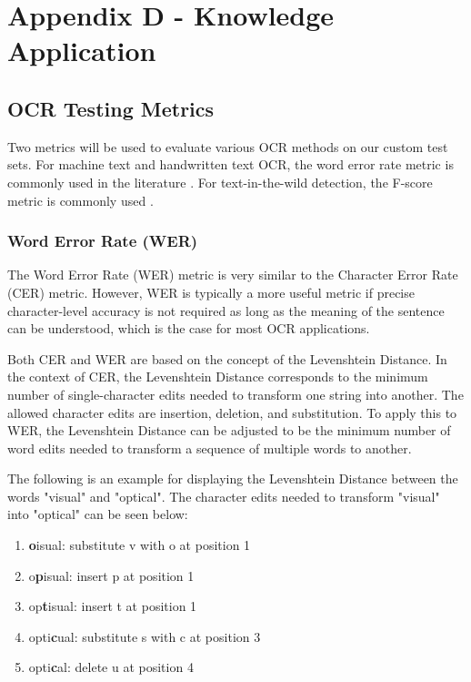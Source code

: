\documentclass[a4paper,11pt]{article}
\begin{document}
\section{Appendix D - Knowledge Application}
\label{appendix-D}

\subsection{OCR Testing Metrics}
Two metrics will be used to evaluate various OCR methods on our custom test sets. For machine text and handwritten text OCR, the word error rate metric is commonly used in the literature \cite{wer-metric}. For text-in-the-wild detection, the F-score metric is commonly used \cite{scene-text-rec}.

\subsubsection{Word Error Rate (WER)}
The Word Error Rate (WER) metric is very similar to the Character Error Rate (CER) metric. However, WER is typically a more useful metric if precise character-level accuracy is not required as long as the meaning of the sentence can be understood, which is the case for most OCR applications.

Both CER and WER are based on the concept of the Levenshtein Distance. In the context of CER, the Levenshtein Distance corresponds to the minimum number of single-character edits needed to transform one string into another. The allowed character edits are insertion, deletion, and substitution. To apply this to WER, the Levenshtein Distance can be adjusted to be the minimum number of word edits needed to transform a sequence of multiple words to another. \cite{wer-metric}

The following is an example for displaying the Levenshtein Distance between the words "visual" and "optical". The character edits needed to transform "visual" into "optical" can be seen below:
\begin{enumerate}
  \item \textbf{o}isual: substitute v with o at position 1
  \item o\textbf{p}isual: insert p at position 1
  \item op\textbf{t}isual: insert t at position 1
  \item opti\textbf{c}ual: substitute s with c at position 3
  \item opti\textbf{c}al: delete u at position 4
\end{enumerate}
\end{document}
